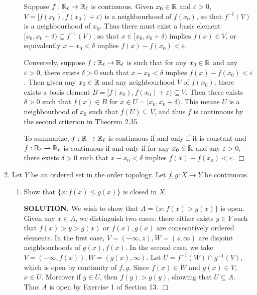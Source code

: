 \documentclass{article}
\begin{document}
\begin{enumerate}
\begin{enumerate}
        Suppose $f: \mathbb{R}_\ell \rightarrow \mathbb{R}_\ell$ is continuous. Given $x_0 \in \mathbb{R}$ and $\varepsilon > 0$, $V = [f(x_0), f(x_0) + \varepsilon)$ is a neighbourhood of $f(x_0)$, so that $f^{-1}(V)$ is a neighbourhood of $x_0$. Thus there must exist a basis element $[x_0, x_0 + \delta) \subseteq f^{-1}(V)$, so that $x \in [x_0, x_0 + \delta)$ implies $f(x) \in V$, or equivalently $x - x_0 < \delta$ implies $f(x) - f(x_0) < \varepsilon$.

        Conversely, suppose $f: \mathbb{R}_\ell \rightarrow \mathbb{R}_\ell$ is such that for any $x_0 \in \mathbb{R}$ and any $\varepsilon > 0$, there exists $\delta > 0$ such that $x - x_0 < \delta$ implies $f(x) - f(x_0) < \varepsilon$. Then given any $x_0 \in \mathbb{R}$ and any neighbourhood $V$ of $f(x_0)$, there exists a basis element $B = [f(x_0), f(x_0) + \varepsilon) \subseteq V$. Then there exists $\delta > 0$ such that $f(x) \in B$ for $x \in U = [x_0, x_0 + \delta)$. This means $U$ is a neighbourhood of $x_0$ such that $f(U) \subseteq V$, and thus $f$ is continuous by the second criterion in Theorem 2.35.

        To summarize, $f: \mathbb{R} \rightarrow \mathbb{R}_\ell$ is continuous if and only if it is constant and $f: \mathbb{R}_\ell \rightarrow \mathbb{R}_\ell$ is continuous if and only if for any $x_0 \in \mathbb{R}$ and any $\varepsilon > 0$, there exists $\delta > 0$ such that $x - x_0 < \delta$ implies $f(x) - f(x_0) < \varepsilon$. $\Box$
    \end{enumerate}

    \item Let $Y$ be an ordered set in the order topology. Let $f, g: X \rightarrow Y$ be continuous.
    \begin{enumerate}
        \item Show that $\{x : f(x) \leq g(x)\}$ is closed in $X$.

        {\bf SOLUTION.} We wish to show that $A = \{x : f(x) > g(x)\}$ is open. Given any $x \in A$, we distinguish two cases: there either exists $y \in Y$ such that $f(x) > y > g(x)$ or $f(x), g(x)$ are consecutively ordered elements. In the first case, $V = (-\infty, z), W = (z, \infty)$ are disjoint neighbourhoods of $g(x), f(x)$. In the second case, we take $V = (-\infty, f(x)), W = (g(x), \infty)$. Let $U = f^{-1}(W) \cap g^{-1}(V)$, which is open by continuity of $f, g$. Since $f(x) \in W$ and $g(x) \in V$, $x \in U$. Moreover if $y \in U$, then $f(y) > g(y)$, showing that $U \subseteq A$. Thus $A$ is open by Exercise 1 of Section 13. $\Box$
        

\end{enumerate}
\end{enumerate}
\end{document}
